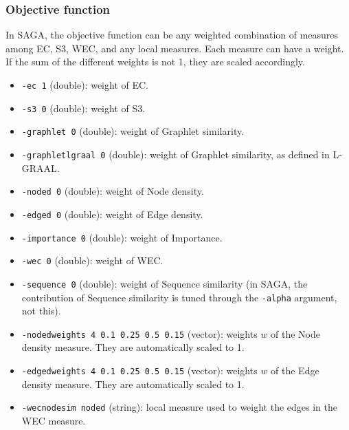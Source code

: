\documentclass[]{article}
\begin{document}
\subsubsection*{Objective function}
In SAGA, the objective function can be any weighted combination of measures among EC, S3, WEC, and any local measures. Each measure can have a weight. If the sum of the different weights is not 1, they are scaled accordingly.

\begin{itemize}
\item\texttt{-ec 1} (double): weight of EC.
\item\texttt{-s3 0} (double): weight of S3.
\item\texttt{-graphlet 0} (double): weight of Graphlet similarity.
\item\texttt{-graphletlgraal 0} (double): weight of Graphlet similarity, as defined in L-GRAAL.
\item\texttt{-noded 0} (double): weight of Node density.
\item\texttt{-edged 0} (double): weight of Edge density.
\item\texttt{-importance 0} (double): weight of Importance.
\item\texttt{-wec 0} (double): weight of WEC.
\item\texttt{-sequence 0} (double): weight of Sequence similarity (in SAGA, the contribution of Sequence similarity is tuned through the \texttt{-alpha} argument, not this).
\item\texttt{-nodedweights 4 0.1 0.25 0.5 0.15} (vector): weights $w$ of the Node density measure. They are automatically scaled to 1.
\item\texttt{-edgedweights 4 0.1 0.25 0.5 0.15} (vector): weights $w$ of the Edge density measure. They are automatically scaled to 1.
\item\texttt{-wecnodesim noded} (string): local measure used to weight the edges in the WEC measure.
\end{itemize}
\end{document}

